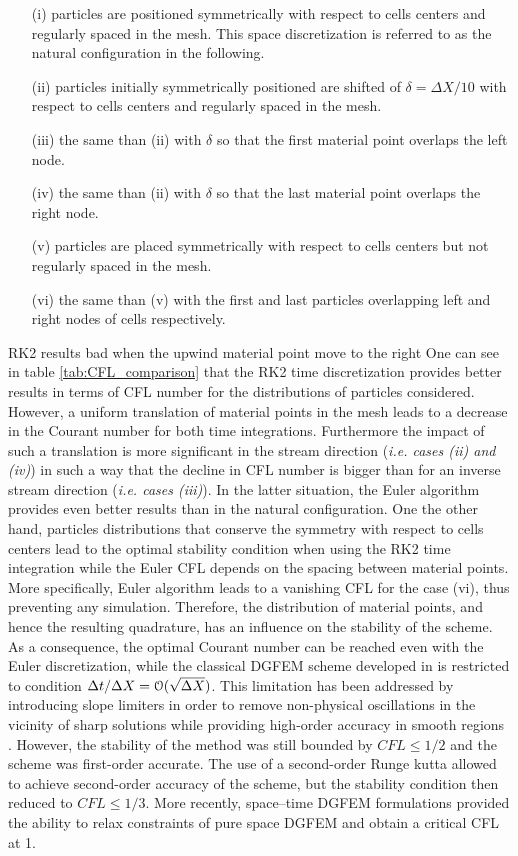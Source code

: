 \begin{itemize}
\item[(i)] particles are positioned symmetrically with respect to cells centers and regularly spaced in the mesh. This space discretization is referred to as the natural configuration in the following.
\item[(ii)] particles initially symmetrically positioned are shifted of $\delta=\Delta X/10$ with respect to cells centers and regularly spaced in the mesh.
\item[(iii)] the same than (ii) with $\delta$ so that the first material point overlaps the left node.
\item[(iv)] the same than (ii) with $\delta$ so that the last material point overlaps the right node.
\item[(v)] particles are placed symmetrically with respect to cells centers but not regularly spaced in the mesh.
\item[(vi)] the same than (v) with the first and last particles overlapping left and right nodes of cells respectively.
\end{itemize}
RK2 results bad when the upwind material point move to the right
One can see in table \ref{tab:CFL_comparison} that the RK2 time discretization provides better results in terms of CFL number for the distributions of particles considered. However, a uniform translation of material points in the mesh leads to a decrease in the Courant number for both time integrations. Furthermore the impact of such a translation is more significant in the stream direction (\textit{i.e. cases (ii) and (iv)}) in such a way that the decline in CFL number is bigger than for an inverse stream direction (\textit{i.e. cases (iii)}). In the latter situation, the Euler algorithm provides even better results than in the natural configuration. One the other hand, particles distributions that conserve the symmetry with respect to cells centers lead to the optimal stability condition when using the RK2 time integration while the Euler CFL depends on the spacing between material points. More specifically, Euler algorithm leads to a vanishing CFL for the case (vi), thus preventing any simulation. Therefore, the distribution of material points, and hence the resulting quadrature, has an influence on the stability of the scheme. As a consequence, the optimal Courant number can be reached even with the Euler discretization, while the classical DGFEM scheme developed in \cite{Chavent_Salzano} is restricted to condition $\Delta t / \Delta X = \mathcal{O}(\sqrt{\Delta X})$. This limitation has been addressed by introducing slope limiters in order to remove non-physical oscillations in the vicinity of sharp solutions while providing high-order accuracy in smooth regions \cite{Chavent_Cockburn}. However, the stability of the method was still bounded by $CFL\leq 1/2$ and the scheme was first-order accurate. The use of a second-order Runge kutta \cite{DGFEM_CFL} allowed to achieve second-order accuracy of the scheme, but the stability condition then reduced to $CFL\leq1/3$. More recently, space–time DGFEM formulations \cite{ST_DGFEM1,ST_DGFEM2} provided the ability to relax constraints of pure space DGFEM and obtain a critical CFL at 1.

